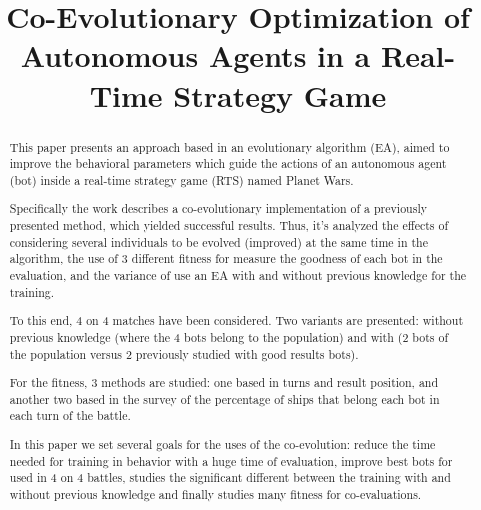 \documentclass{llncs}
\begin{document}

\title{Co-Evolutionary Optimization of Autonomous Agents in a Real-Time Strategy Game}





%

\maketitle

%
%
\begin{abstract}
This paper presents an approach based in an evolutionary algorithm
(EA), aimed to improve the behavioral parameters which guide the
actions of an autonomous agent (bot) inside a real-time strategy game
(RTS) named Planet Wars. 

Specifically the work describes a co-evolutionary implementation of a
previously presented method, which yielded successful results.
Thus, it's analyzed the effects of considering several individuals
to be evolved (improved) at the same time in the algorithm,
the use of 3 different fitness for measure the goodness of each bot in the evaluation,
and the variance of use an EA with and without previous knowledge for the training.

To this end, 4 on 4 matches have been considered. Two variants are presented:
without previous knowledge (where the 4 bots belong to the population) and with
(2 bots of the population versus 2 previously studied with good results bots).

For the fitness, 3 methods are studied: one based in turns and result position,
and another two based in the survey of the percentage of ships that belong each bot in each turn of the battle.

In this paper we set several goals for the uses of the co-evolution:
reduce the time needed for training in behavior with a huge time of evaluation,
improve best bots for used in 4 on 4 battles,
studies the significant different between the training with and without previous knowledge
and finally studies many fitness for co-evaluations.

\end{abstract}
\end{document}
